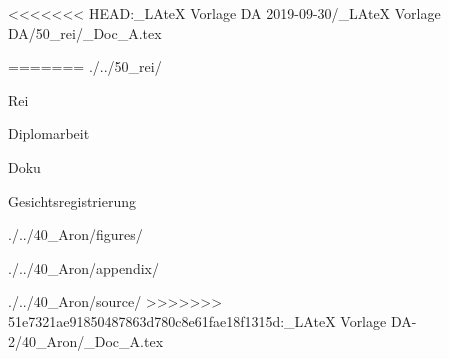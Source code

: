 <<<<<<< HEAD:_LAteX Vorlage DA 2019-09-30/_LAteX Vorlage DA/50_rei/_Doc_A.tex
\ifdefined\bordner
\renewcommand{\bordner}{./../50_rei/}
\else
\newcommand{\bordner}{./../50_rei/}
\fi


\ifdefined\autor
\renewcommand{\autor}{Rei}
\else
\newcommand{\autor}{Rei}
\fi

\ifdefined\titelf
\renewcommand{\titelf}{Diplomarbeit}
\else
\newcommand{\titelf}{Diplomarbeit}
\fi


\ifdefined\docname
\renewcommand{\docname}{Doku}
\else
\newcommand{\docname}{Doku}
\fi



\ifdefined\titels
\renewcommand{\titels}{\docname}
\else
\newcommand{\titels}{\docname}
\fi

\ifdefined\ordnerfigures
\renewcommand{\ordnerfigures}{\bordner figures/}
\else
\newcommand{\ordnerfigures}{\bordner figures/}
\fi

\ifdefined\ordnerappendix
\renewcommand{\ordnerappendix}{\bordner appendix/}
\else
\newcommand{\ordnerappendix}{\bordner appendix/}
\fi

\ifdefined\ordnersource
\renewcommand{\ordnersource}{\bordner source/}
\else
\newcommand{\ordnersource}{\bordner source/}
=======
\ifdefined\bordner
\renewcommand{\bordner}{./../40_Aron/}
\else
\newcommand{\bordner}{./../40_Aron/}
\fi


\ifdefined\autor
\renewcommand{\autor}{Aron Terzeta}
\else
\newcommand{\autor}{Aron Terzeta}
\fi

\ifdefined\titelf
\renewcommand{\titelf}{Diplomarbeit}
\else
\newcommand{\titelf}{Diplomarbeit}
\fi


\ifdefined\docname
\renewcommand{\docname}{Gesichtsregistrierung}
\else
\newcommand{\docname}{Gesichtsregistrierung}
\fi



\ifdefined\titels
\renewcommand{\titels}{\docname}
\else
\newcommand{\titels}{\docname}
\fi

\ifdefined\ordnerfigures
\renewcommand{\ordnerfigures}{\bordner figures/}
\else
\newcommand{\ordnerfigures}{\bordner figures/}
\fi

\ifdefined\ordnerappendix
\renewcommand{\ordnerappendix}{\bordner appendix/}
\else
\newcommand{\ordnerappendix}{\bordner appendix/}
\fi

\ifdefined\ordnersource
\renewcommand{\ordnersource}{\bordner source/}
\else
\newcommand{\ordnersource}{\bordner source/}
>>>>>>> 51e7321ae91850487863d780c8e61fae18f1315d:_LAteX Vorlage DA-2/40_Aron/_Doc_A.tex
\fi